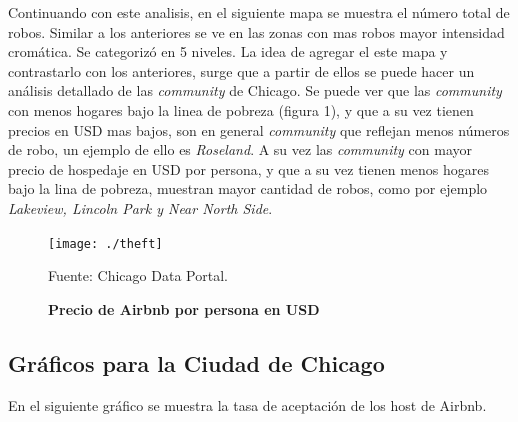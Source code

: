 \documentclass[12pt]{article} %
\begin{document}
Continuando con este analisis, en el siguiente mapa se muestra el número total de robos. Similar a los anteriores se ve en las zonas con mas robos mayor intensidad crom\'atica. Se categoriz\'o en 5 niveles. La idea de agregar el este mapa y contrastarlo con los anteriores, surge que a partir de ellos se puede hacer un an\'alisis detallado de las \textit{community} de Chicago. Se puede ver que las \textit{community} con menos hogares bajo la linea de pobreza (figura 1), y que a su vez tienen precios en USD mas bajos, son en general \textit{community} que reflejan menos números de robo, un ejemplo de ello es \textit{Roseland}. A su vez las \textit{community} con mayor precio de hospedaje en USD por persona, y que a su vez tienen menos hogares bajo la lina de pobreza, muestran mayor cantidad de robos, como por ejemplo \textit{Lakeview, Lincoln Park y Near North Side}.


\begin{figure}[H]
	\centering
	\begin{minipage}{0.65\textwidth}
		\centering
		\caption{\textbf{Precio de Airbnb por persona en USD}}
		\texttt{[image: ./theft]} %
		\begin{flushleft}
			{\footnotesize Fuente: Chicago Data Portal.}
		\end{flushleft}
\end{minipage} \end{figure}



\subsection{Gráficos para la Ciudad de Chicago}

En el siguiente gráfico se muestra la tasa de aceptaci\'on de los host de Airbnb.
\end{document}
